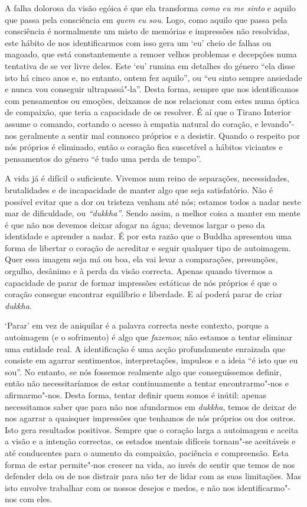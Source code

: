 A falha dolorosa da visão egóica é que ela transforma \emph{como eu me
sinto} e aquilo que passa pela consciência em \emph{quem eu sou}. Logo,
como aquilo que passa pela consciência é normalmente um misto de
memórias e impressões não resolvidas, este hábito de nos identificarmos
com isso gera um `eu' cheio de falhas ou magoado, que está
constantemente a remoer velhos problemas e decepções numa tentativa de
se ver livre deles. Este `eu' rumina em detalhes do género “ela disse
isto há cinco anos e, no entanto, ontem fez aquilo”, ou “eu sinto sempre
ansiedade e nunca vou conseguir ultrapassá"-la”. Desta forma, sempre que
nos identificamos com pensamentos ou emoções, deixamos de nos relacionar
com estes numa óptica de compaixão, que teria a capacidade de os
resolver. É aí que o Tirano Interior assume o comando, cortando o acesso
à empatia natural do coração, e levando"-nos geralmente a sentir mal
connosco próprios e a desistir. Quando o respeito por nós próprios é
eliminado, então o coração fica suscetível a hábitos viciantes e
pensamentos do género “é tudo uma perda de tempo”.

A vida já é difícil o suficiente. Vivemos num reino de separações,
necessidades, brutalidades e de incapacidade de manter algo que seja
satisfatório. Não é possível evitar que a dor ou tristeza venham até
nós; estamos todos a nadar neste mar de dificuldade, ou \emph{“dukkha”}.
Sendo assim, a melhor coisa a manter em mente é que não nos devemos
deixar afogar na água; devemos largar o peso da identidade e aprender a
nadar. É por esta razão que o Buddha apresentou uma forma de libertar o
coração de acreditar e seguir qualquer tipo de autoimagem. Quer essa
imagem seja má ou boa, ela vai levar a comparações, presunções, orgulho,
desânimo e à perda da visão correcta. Apenas quando tivermos a capacidade
de parar de formar impressões estáticas de nós próprios é que o coração
consegue encontrar equilíbrio e liberdade. E aí poderá parar de criar
\emph{dukkha}.

`Parar' em vez de aniquilar é a palavra correcta neste contexto, porque
a autoimagem (e o sofrimento) é algo que \emph{fazemos}; não estamos a
tentar eliminar uma entidade real. A identificação é uma acção
profundamente enraizada que consiste em agarrar sentimentos,
interpretações, impulsos e a ideia “é isto que eu sou”. No entanto, se
nós fossemos realmente algo que conseguíssemos definir, então não
necessitaríamos de estar continuamente a tentar encontrarmo"-nos e
afirmarmo"-nos. Desta forma, tentar definir quem somos é inútil: apenas
necessitamos saber que para não nos afundarmos em \emph{dukkha}, temos
de deixar de nos agarrar a quaisquer impressões que tenhamos de nós
próprios ou dos outros. Isto gera resultados positivos. Sempre que o
coração larga a autoimagem e aceita a visão e a intenção correctas, os
estados mentais difíceis tornam"-se aceitáveis e até conducentes para o
aumento da compaixão, paciência e compreensão. Esta forma de estar
permite"-nos crescer na vida, ao invés de sentir que temos de nos
defender dela ou de nos distrair para não ter de lidar com as suas
limitações. Mas isto envolve trabalhar com os nossos desejos e medos, e
não nos identificarmo"-nos com eles.

